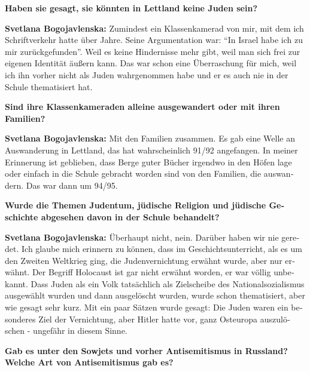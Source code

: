 \begin{otherlanguage}{ngerman}
\textbf{Haben sie gesagt, sie könnten in Lettland keine Juden sein?}

\textbf{Svetlana Bogojavlenska:} Zumindest ein Klassenkamerad von mir, mit dem ich Schriftverkehr hatte über Jahre. Seine Argumentation war: "`In Israel habe ich zu mir zurückgefunden"'. Weil es keine Hindernisse mehr gibt, weil man sich frei zur eigenen Identität äußern kann. Das war schon eine Überraschung für mich, weil ich ihn vorher nicht als Juden wahrgenommen habe und er es auch nie in der Schule thematisiert hat.

\textbf{Sind ihre Klassenkameraden alleine ausgewandert oder mit ihren Familien?}

\textbf{Svetlana Bogojavlenska:} Mit den Familien zusammen. Es gab eine Welle an Auswanderung in Lettland, das hat wahrscheinlich 91/92 angefangen. In meiner Erinnerung ist geblieben, dass Berge guter Bücher irgendwo in den Höfen lage oder einfach in die Schule gebracht worden sind von den Familien, die auswandern. Das war dann um 94/95.

\textbf{Wurde die Themen Judentum, jüdische Religion und jüdische Geschichte abgesehen davon in der Schule behandelt?}

\textbf{Svetlana Bogojavlenska:} Überhaupt nicht, nein. Darüber haben wir nie geredet. Ich glaube mich erinnern zu können, dass im Geschichtsunterricht, als es um den Zweiten Weltkrieg ging, die Judenvernichtung erwähnt wurde, aber nur erwähnt. Der Begriff Holocaust ist gar nicht erwähnt worden, er war völlig unbekannt. Dass Juden als ein Volk tatsächlich als Zielscheibe des Nationalsozialismus ausgewählt wurden und dann ausgelöscht wurden, wurde schon thematisiert, aber wie gesagt sehr kurz. Mit ein paar Sätzen wurde gesagt: Die Juden waren ein besonderes Ziel der Vernichtung, aber Hitler hatte vor, ganz Osteuropa auszulöschen - ungefähr in diesem Sinne.

\textbf{Gab es unter den Sowjets und vorher Antisemitismus in Russland? Welche Art von Antisemitismus gab es?}


\end{otherlanguage}
